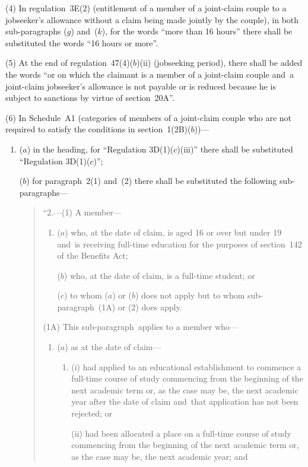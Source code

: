 \documentclass[12pt,a4paper]{article}
\begin{document}
(4) In regulation~3E(2) (entitlement of a member of a joint-claim couple to a jobseeker’s allowance without a claim being made jointly by the couple), in both sub-paragraphs ($g$)  and~($k$), for the words “more than 16 hours” there shall be substituted the words “16 hours or more”.

(5) At the end of regulation~47(4)($b$)(ii)  (jobseeking period), there shall be added the words “or on which the claimant is a member of a joint-claim couple and~a joint-claim jobseeker’s allowance is not payable or is reduced because he is subject to sanctions by virtue of section~20A”.

(6) In Schedule~A1 (categories of members of a joint-claim couple who are not required to satisfy the conditions in section~1(2B)($b$))—
\begin{enumerate}\item[]
($a$) in the heading, for “Regulation 3D(1)($c$)(iii)” there shall be substituted “Regulation 3D(1)($c$)”;

($b$) for paragraph~2(1) and~(2) there shall be substituted the following sub-paragraphs—
\begin{quotation}
“2.---(1)  A member—
\begin{enumerate}\item[]
($a$) who, at the date of claim, is aged 16 or over but under 19 and~is receiving full-time education for the purposes of section~142 of the Benefits Act;

($b$) who, at the date of claim, is a full-time student; or

($c$) to whom ($a$)  or ($b$)  does not apply but to whom sub-paragraph~(1A) or (2) does apply.
\end{enumerate}

(1A) This sub-paragraph~applies to a member who—
\begin{enumerate}\item[]
($a$) as at the date of claim—
\begin{enumerate}\item[]
(i) had applied to an educational establishment to commence a full-time course of study commencing from the beginning of the next academic term or, as the case may be, the next academic year after the date of claim and~that application has not been rejected; or

(ii) had been allocated a place on a full-time course of study commencing from the beginning of the next academic term or, as the case may be, the next academic year; and
\end{enumerate}


\end{enumerate}
\end{quotation}
\end{enumerate}
\end{document}
